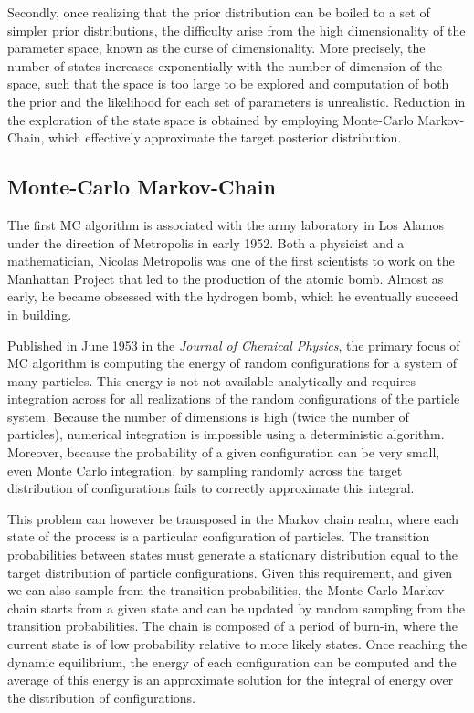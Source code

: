 Secondly, once realizing that the prior distribution can be boiled to a set of simpler prior distributions, the difficulty arise from the high dimensionality of the parameter space, known as the curse of dimensionality.
More precisely, the number of states increases exponentially with the number of dimension of the space, such that the space is too large to be explored and computation of both the prior and the likelihood for each set of parameters is unrealistic.
Reduction in the exploration of the state space is obtained by employing Monte-Carlo Markov-Chain, which effectively approximate the target posterior distribution.

\subsection{Monte-Carlo Markov-Chain}

The first \acrshort{MC} algorithm is associated with the army laboratory in Los Alamos under the direction of Metropolis in early 1952.
Both a physicist and a mathematician, Nicolas Metropolis was one of the first scientists to work on the Manhattan Project that led to the production of the atomic bomb.
Almost as early, he became obsessed with the hydrogen bomb, which he eventually succeed in building.

Published in June 1953 in the \textit{Journal of Chemical Physics}, the primary focus of \acrshort{MC} algorithm is computing the energy of random configurations for a system of many particles.
This energy is not not available analytically and requires integration across for all realizations of the random configurations of the particle system.
Because the number of dimensions is high (twice the number of particles), numerical integration is impossible using a deterministic algorithm.
Moreover, because the probability of a given configuration can be very small, even Monte Carlo integration, by sampling randomly across the target distribution of configurations fails to correctly approximate this integral.

This problem can however be transposed in the Markov chain realm, where each state of the process is a particular configuration of particles.
The transition probabilities between states must generate a stationary distribution equal to the target distribution of particle configurations.
Given this requirement, and given we can also sample from the transition probabilities, the Monte Carlo Markov chain starts from a given state and can be updated by random sampling from the transition probabilities.
The chain is composed of a period of burn-in, where the current state is of low probability relative to more likely states.
Once reaching the dynamic equilibrium, the energy of each configuration can be computed and the average of this energy is an approximate solution for the integral of energy over the distribution of configurations.


